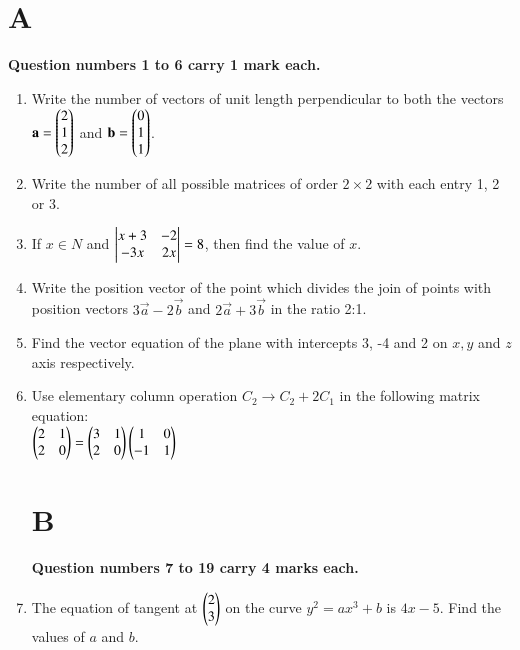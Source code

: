 \documentclass[journal,12pt,onecolumn]{IEEEtran}
\theoremstyle{remark}
\begin{document}
\section{\textbf{A}}
\textbf{Question numbers 1 to 6 carry 1 mark each.}\\
\begin{enumerate}

	\item Write the number of vectors of unit length perpendicular to both the vectors $\mathbf{a} = \begin{pmatrix}2 \\ 1 \\ 2\end{pmatrix}$ and $\mathbf{b} = \begin{pmatrix}0\\ 1\\ 1\end{pmatrix}$.\\
	
	\item Write the number of all possible matrices of order $2\times2$ with each entry 1, 2 or 3.\\
	
	\item If $ x \in N$ and $\begin{vmatrix}x+3 & -2 \\ -3x & 2x\end{vmatrix} = 8$, then find the value of $x$.\\
	
	\item Write the position vector of the point which divides the join of points with position vectors $3\vec{a} - 2\vec{b}$ and $2\vec{a} + 3\vec{b}$ in the ratio 2:1.\\
	
	\item Find the vector equation of the plane  with intercepts 3, -4 and 2 on $x, y$ and $z$ axis respectively.\\
	
	\item Use elementary column operation $ C_2 \rightarrow C_2  + 2C_1$ in the following matrix equation:\\
	$\begin{pmatrix}2 & 1 \\ 2 & 0\end{pmatrix} = \begin{pmatrix}3 & 1 \\ 2 & 0\end{pmatrix}\begin{pmatrix}1 & 0 \\ -1 & 1\end{pmatrix}$\\
		
\section{\textbf{B}}
\textbf{Question numbers 7 to 19 carry 4 marks each.}\\

	\item The equation of tangent at $\begin{pmatrix}2 \\ 3\end{pmatrix}$ on the curve $y^2 = ax^3 + b$ is $4x -5$. Find the values of $a$ and $b$. \\
	

\end{enumerate}
\end{document}
